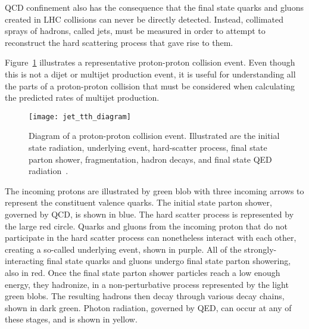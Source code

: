 QCD confinement also has the consequence that the final state quarks and gluons created in LHC collisions
can never be directly detected.
Instead, collimated sprays of hadrons, called jets, must be measured in order to attempt to reconstruct the
hard scattering process that gave rise to them.

Figure~\ref{fig:jet_tth_diagram} illustrates a representative proton-proton collision event.
Even though this is not a dijet or multijet production event, it is useful for understanding all the parts of a proton-proton collision that must be considered when calculating the predicted rates of multijet production.

\begin{figure}[!ht]
    \centering
\texttt{[image: jet\_tth\_diagram]}
\caption{Diagram of a proton-proton collision event.
Illustrated are the initial state radiation, underlying event, hard-scatter process, final state parton shower,
fragmentation, hadron decays, and final state QED radiation~\cite{sherpa-2004}.}
\label{fig:jet_tth_diagram}
\end{figure}
The incoming protons are illustrated by green blob with three incoming arrows to represent the constituent valence quarks.
The initial state parton shower, governed by QCD, is shown in blue.
The hard scatter process is represented by the large red circle.
Quarks and gluons from the incoming proton that do not participate in the hard scatter process can nonetheless interact with each other, creating a so-called underlying event, shown in purple.
All of the strongly-interacting final state quarks and gluons undergo final state parton showering, also in red.
Once the final state parton shower particles reach a low enough energy, they hadronize, in a non-perturbative process represented by the light green blobs.
The resulting hadrons then decay through various decay chains, shown in dark green.
Photon radiation, governed by QED, can occur at any of these stages, and is shown in yellow.

